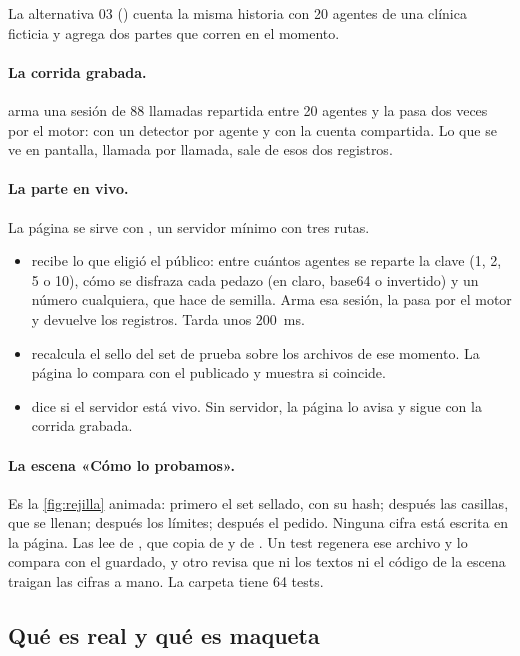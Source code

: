 La alternativa 03 () cuenta la misma historia con 20
agentes de una clínica ficticia y agrega dos partes que corren en el momento.

\paragraph{La corrida grabada.}  arma una sesión de 88 llamadas repartida entre
20 agentes y la pasa dos veces por el motor: con un detector por agente y con la cuenta compartida. Lo
que se ve en pantalla, llamada por llamada, sale de esos dos registros.

\paragraph{La parte en vivo.} La página se sirve con , un servidor mínimo con tres
rutas.
\begin{itemize}
  \item {} recibe lo que eligió el público: entre cuántos agentes se reparte la clave
    (1, 2, 5 o 10), cómo se disfraza cada pedazo (en claro, base64 o invertido) y un número cualquiera,
    que hace de semilla. Arma esa sesión, la pasa por el motor y devuelve los registros. Tarda unos
    200~ms.
  \item {} recalcula el sello del set de prueba sobre los archivos de ese momento. La
    página lo compara con el publicado y muestra si coincide.
  \item {} dice si el servidor está vivo. Sin servidor, la página lo avisa y sigue con
    la corrida grabada.
\end{itemize}

\paragraph{La escena «Cómo lo probamos».} Es la \cref{fig:rejilla} animada: primero el set sellado,
con su hash; después las casillas, que se llenan; después los límites; después el pedido. Ninguna
cifra está escrita en la página. Las lee de , que  copia
de  y de . Un test regenera ese archivo y lo compara con el
guardado, y otro revisa que ni los textos ni el código de la escena traigan las cifras a mano. La
carpeta tiene 64 tests.

\subsection{Qué es real y qué es maqueta}

